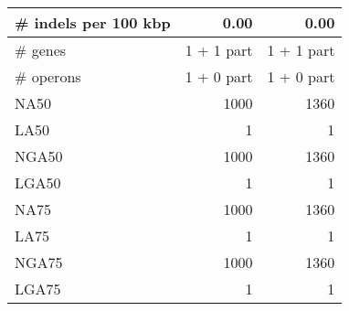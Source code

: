\begin{table}[ht]
\begin{center}
\begin{tabular}{|l*{2}{|r}|}
\# indels per 100 kbp & 0.00 & 0.00 \\ \hline
\# genes & 1 + 1 part & 1 + 1 part \\ \hline
\# operons & 1 + 0 part & 1 + 0 part \\ \hline
NA50 & 1000 & 1360 \\ \hline
LA50 & 1 & 1 \\ \hline
NGA50 & 1000 & 1360 \\ \hline
LGA50 & 1 & 1 \\ \hline
NA75 & 1000 & 1360 \\ \hline
LA75 & 1 & 1 \\ \hline
NGA75 & 1000 & 1360 \\ \hline
LGA75 & 1 & 1 \\ \hline
\end{tabular}
\end{center}
\end{table}
